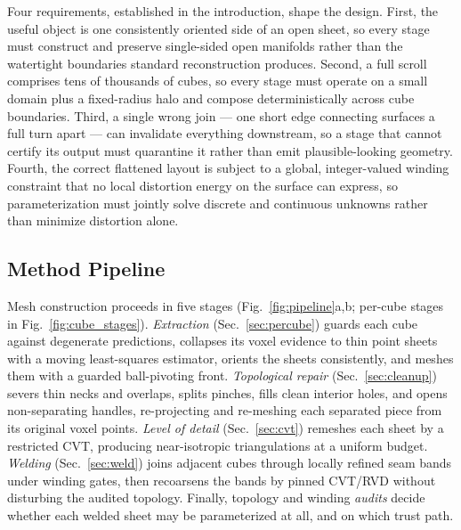 Four requirements, established in the introduction, shape the design. First, the useful object is one consistently oriented side of an open sheet, so every stage must construct and preserve single-sided open manifolds rather than the watertight boundaries standard reconstruction produces. Second, a full scroll comprises tens of thousands of cubes, so every stage must operate on a small domain plus a fixed-radius halo and compose deterministically across cube boundaries. Third, a single wrong join --- one short edge connecting surfaces a full turn apart --- can invalidate everything downstream, so a stage that cannot certify its output must quarantine it rather than emit plausible-looking geometry. Fourth, the correct flattened layout is subject to a global, integer-valued winding constraint that no local distortion energy on the surface can express, so parameterization must jointly solve discrete and continuous unknowns rather than minimize distortion alone.

\subsection{Method Pipeline}
\label{sec:pipeline}

Mesh construction proceeds in five stages (Fig.~\ref{fig:pipeline}a,b; per-cube stages in Fig.~\ref{fig:cube_stages}). {\em Extraction} (Sec.~\ref{sec:percube}) guards each cube against degenerate predictions, collapses its voxel evidence to thin point sheets with a moving least-squares estimator, orients the sheets consistently, and meshes them with a guarded ball-pivoting front. {\em Topological repair} (Sec.~\ref{sec:cleanup}) severs thin necks and overlaps, splits pinches, fills clean interior holes, and opens non-separating handles, re-projecting and re-meshing each separated piece from its original voxel points. {\em Level of detail} (Sec.~\ref{sec:cvt}) remeshes each sheet by a restricted CVT, producing near-isotropic triangulations at a uniform budget. {\em Welding} (Sec.~\ref{sec:weld}) joins adjacent cubes through locally refined seam bands under winding gates, then recoarsens the bands by pinned CVT/RVD without disturbing the audited topology. Finally, topology and winding {\em audits} decide whether each welded sheet may be parameterized at all, and on which trust path.

